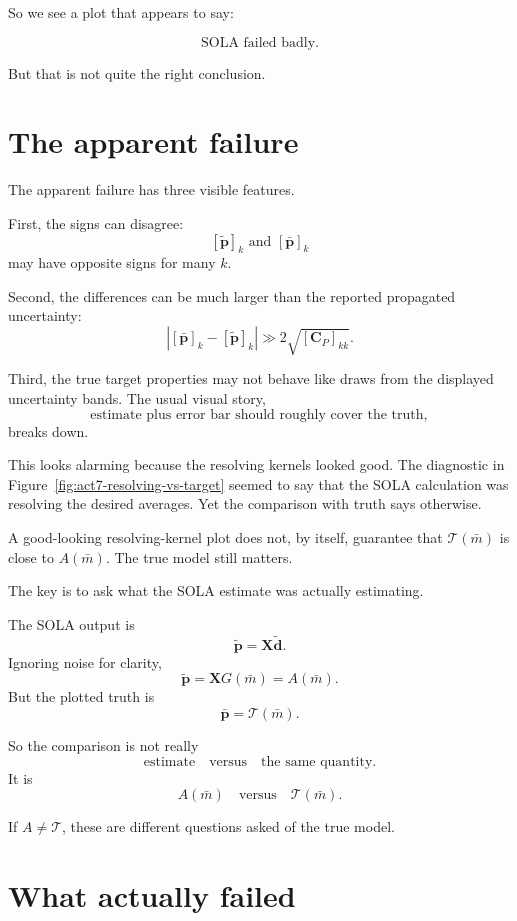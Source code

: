 \documentclass[11pt,openany]{book}
\theoremstyle{definition}
\theoremstyle{remark}
\newcommand{\Tau}{\mathcal{T}}
\begin{document}
So we see a plot that appears to say:

\[
  \text{SOLA failed badly.}
\]

But that is not quite the right conclusion.

\section{The apparent failure}

The apparent failure has three visible features.

First, the signs can disagree:
\[
  [\widetilde{\mathbf p}]_k
  \text{ and }
  [\bar{\mathbf p}]_k
\]
may have opposite signs for many \(k\).

Second, the differences can be much larger than the reported propagated uncertainty:
\[
  \left|
    [\bar{\mathbf p}]_k-[\widetilde{\mathbf p}]_k
  \right|
  \gg
  2\sqrt{[\mathbf C_P]_{kk}}.
\]

Third, the true target properties may not behave like draws from the displayed uncertainty
bands. The usual visual story,
\[
  \text{estimate plus error bar should roughly cover the truth},
\]
breaks down.

This looks alarming because the resolving kernels looked good. The diagnostic in
Figure~\ref{fig:act7-resolving-vs-target} seemed to say that the SOLA calculation was resolving
the desired averages. Yet the comparison with truth says otherwise.

\begin{warningbox}
A good-looking resolving-kernel plot does not, by itself, guarantee that
\(\Tau(\bar m)\) is close to \(A(\bar m)\). The true model still matters.
\end{warningbox}

The key is to ask what the SOLA estimate was actually estimating.

The SOLA output is
\[
  \widetilde{\mathbf p}
  =
  \mathbf X\widetilde{\mathbf d}.
\]
Ignoring noise for clarity,
\[
  \widetilde{\mathbf p}
  =
  \mathbf XG(\bar m)
  =
  A(\bar m).
\]
But the plotted truth is
\[
  \bar{\mathbf p}
  =
  \Tau(\bar m).
\]

So the comparison is not really
\[
  \text{estimate}
  \quad\text{versus}\quad
  \text{the same quantity}.
\]
It is
\[
  A(\bar m)
  \quad\text{versus}\quad
  \Tau(\bar m).
\]

If \(A\neq\Tau\), these are different questions asked of the true model.

\section{What actually failed}
\end{document}
